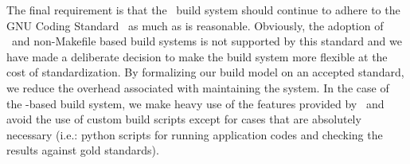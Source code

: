 
The final requirement is that the \draco\ build system should continue to adhere to the GNU Coding Standard~\cite{gnu} as much as is reasonable.  Obviously, the adoption of \cmake\ and non-Makefile based build systems is not supported by this standard and we have made a deliberate decision to make the build system more flexible at the cost of standardization.  By formalizing our build model on an accepted standard, we reduce the overhead associated with maintaining the system. In the case of the \cmake-based build system, we make heavy use of the features provided by \cmake\ and avoid the use of custom build scripts except for cases that are absolutely necessary (i.e.: python scripts for running application codes and checking the results against gold standards). 

%
%

